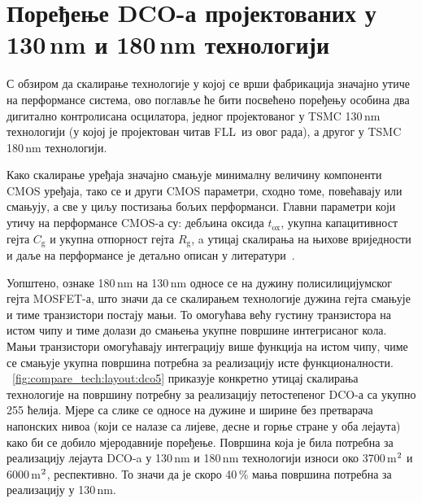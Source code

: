\documentclass[master]{finthesis}
\def \FLL  {FLL} %
\def \DCO  {DCO} %
\begin{document}
\section{Поређење \DCO-а пројектованих у 130\texorpdfstring{\,}{ }nm и 180\texorpdfstring{\,}{ }nm технологији} \label{section:compare_tech}
С обзиром да скалирање технологије у којој се врши фабрикација значајно утиче на перформансе система, ово поглавље ће бити посвећено поређењу особина два дигитално контролисана осцилатора, једног пројектованог у TSMC 130\,nm технологији (у којој је пројектован читав \FLL\ из овог рада), а другог у TSMC 180\,nm технологији. \par
Како скалирање уређаја значајно смањује минималну величину компоненти CMOS уређаја, тако се и други CMOS параметри, сходно томе, повећавају или смањују, а све у циљу постизања бољих перформанси. Главни параметри који утичу на перформансе CMOS-а су: дебљина оксида $t_\text{ox}$, укупна капацитивност гејта $C_\text{g}$ и укупна отпорност гејта $R_\text{g}$, a утицај скалирања на њихове вриједности и даље на перформансе је детаљно описан у литератури~\cite{HASSAN2006275}. \par
Уопштено, ознаке 180\,nm на 130\,nm односе се на дужину полисилицијумског гејта MOSFET-а, што значи да се скалирањем технологије дужина гејта смањује и тиме транзистори постају мањи. То омогућава већу густину транзистора на истом чипу и тиме долази до смањења укупне површине интегрисаног кола. Мањи транзистори омогућавају интеграцију више функција на истом чипу, чиме се смањује укупна површина потребна за реализацију исте функционалности. \figurename~\ref{fig:compare_tech:layout:dco5} приказује конкретно утицај скалирања технологије на површину потребну за реализацију петостепеног \DCO-а са укупно 255 ћелија. Мјере са слике се односе на дужине и ширине без претварача напонских нивоа (који се налазе са лијеве, десне и горње стране у оба лејаута) како би се добило мјеродавније поређење. Површина која је била потребна за реализацију лејаута \DCO-a у 130\,nm и 180\,nm технологији износи око 3700\,\text\textmu m$^\text2$ и 6000\,\text\textmu m$^\text2$, респективно. То значи да је скоро 40\,\% мања површина потребна за реализацију у 130\,nm. \par
\end{document}
